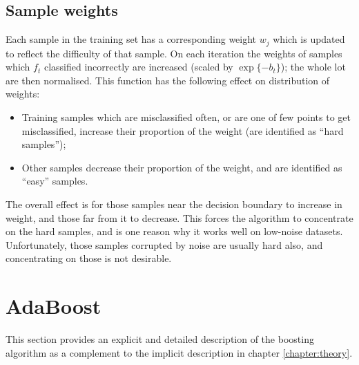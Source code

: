 \subsection{Sample weights}
\label{sec:sample weights}

Each sample in the training set has a corresponding weight $w_j$ which
is updated to reflect the difficulty of that sample.  On each iteration the
weights of samples which $f_t$ classified incorrectly are increased
(scaled by $\exp \{ -b_t \}$); the whole lot are then normalised.
This function has the following effect on distribution of weights:

\begin{itemize}

\item	Training samples which are misclassified often, or are one of 
	few points to get misclassified, increase their proportion of
	the weight (are identified as ``hard samples'');

\item	Other samples decrease their proportion of the weight, and are
	identified as ``easy'' samples.

\end{itemize}

The overall effect is for those samples near the decision boundary to
increase in weight, and those far from it to decrease.  This forces
the algorithm to concentrate on the hard samples, and is one reason
why it works well on low-noise datasets.  Unfortunately, those samples
corrupted by noise are usually hard also, and concentrating on those
is not desirable.

\section{AdaBoost}
\label{sec:adaboost}

This section provides an explicit and detailed description of the
boosting algorithm as a complement to the implicit description in
chapter \ref{chapter:theory}.

